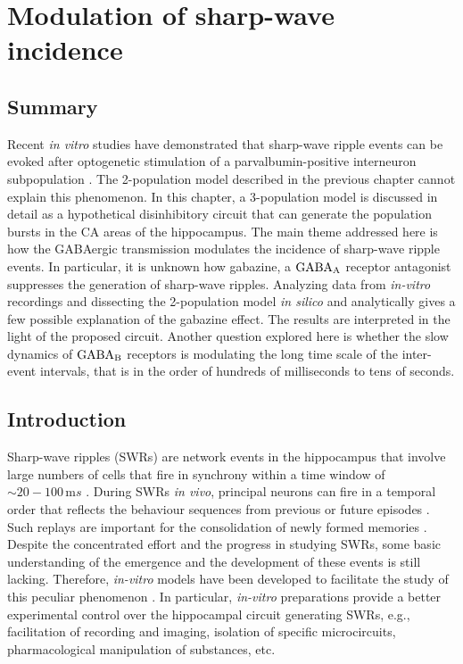 \chapter{Modulation of sharp-wave incidence}
\label{chap:swr}

\section{Summary}
  Recent \textit{in vitro} studies have demonstrated that sharp-wave ripple
  events can be evoked after optogenetic stimulation of a parvalbumin-positive
  interneuron subpopulation \citep{Schlingloff2014, Kohus2016}. The
  2-population model described in the previous chapter cannot explain this
  phenomenon. In this chapter, a 3-population model is discussed in detail as a
  hypothetical disinhibitory circuit that can generate the population bursts in
  the CA areas of the hippocampus. The main theme addressed here is how the
  GABAergic transmission modulates the incidence of sharp-wave ripple events.
  In particular, it is unknown how gabazine, a $\rm GABA_A$ receptor antagonist
  suppresses the generation of sharp-wave ripples. Analyzing data from
  \textit{in-vitro} recordings and dissecting the 2-population model \textit{in
  silico} and analytically gives a few possible explanation of the gabazine
  effect. The results are interpreted in the light of the proposed circuit.
  Another question explored here is whether the slow dynamics of $\rm GABA_B$
  receptors is modulating the long time scale of the inter-event intervals,
  that is in the order of hundreds of milliseconds to tens of seconds.

\section{Introduction}
  Sharp-wave ripples (SWRs) are network events in the hippocampus that involve
  large numbers of cells that fire in synchrony within a time window of
  $\sim20-100\, \mathrm ms$ \citep{Buzsaki2015}. During SWRs \textit{in vivo},
  principal neurons can fire in a temporal order that reflects the behaviour
  sequences from previous \citep{Lee2002} or future episodes
  \citep{Dragoi2011}. Such replays are important for the consolidation of newly
  formed memories \citep{Girardeau2009}. Despite the concentrated effort and
  the progress in studying SWRs, some basic understanding of the emergence and
  the development of these events is still lacking. Therefore,
  \textit{in-vitro} models have been developed to facilitate the study of this
  peculiar phenomenon \citep{Maier2003}. In particular, \textit{in-vitro}
  preparations provide a better experimental control over the hippocampal
  circuit generating SWRs, e.g., facilitation of recording and imaging,
  isolation of specific microcircuits, pharmacological manipulation of
  substances, etc.

